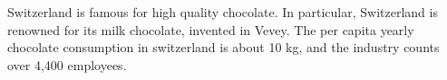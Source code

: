 Switzerland is famous for high quality chocolate. In particular, Switzerland is renowned for its milk chocolate, invented in Vevey.
The per capita yearly chocolate consumption in switzerland is about 10 kg, and the industry counts over 4,400 employees.